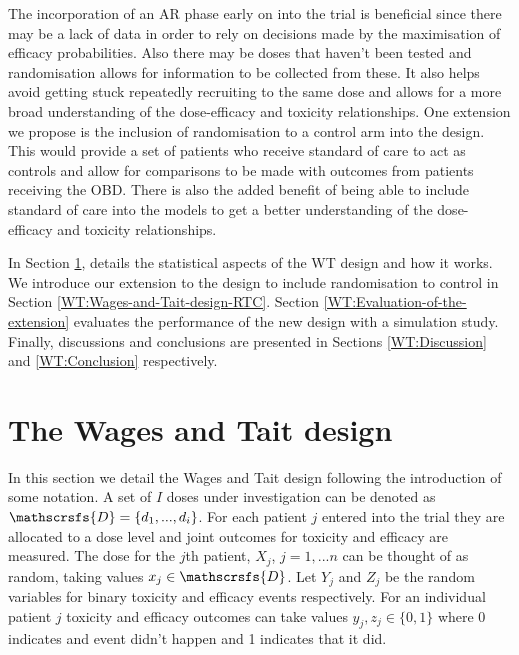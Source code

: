 The incorporation of an AR phase early on into the trial is beneficial since there may be a lack of data in order to rely on decisions made by the maximisation of efficacy probabilities. Also there may be doses that haven't been tested and randomisation allows for information to be collected from these. It also helps avoid getting stuck repeatedly recruiting to the same dose and allows for a more broad understanding of the dose-efficacy and toxicity relationships. One extension we propose is the inclusion of randomisation to a control arm into the design. This would provide a set of patients who receive standard of care to act as controls and allow for comparisons to be made with outcomes from patients receiving the OBD. There is also the added benefit of being able to include standard of care into the models to get a better understanding of the dose-efficacy and toxicity relationships.  

In Section \ref{WT:Wages-and-Tait-design}, details the statistical aspects of the WT design and how it works. We introduce our extension to the design to include randomisation to control in Section \ref{WT:Wages-and-Tait-design-RTC}. Section \ref{WT:Evaluation-of-the-extension} evaluates the performance of the new design with a simulation study. Finally, discussions and conclusions are presented in Sections \ref{WT:Discussion} and \ref{WT:Conclusion} respectively.  


\section{The Wages and Tait design}
\label{WT:Wages-and-Tait-design}

In this section we detail the Wages and Tait design following the introduction of some notation. A set of $I$ doses under investigation can be denoted as $\mathscrsfs{D} = \{d_1, ...,d_i\}$. For each patient $j$ entered into the trial they are allocated to a dose level and joint outcomes for toxicity and efficacy are measured. The dose for the $j$th patient, $X_j$, $j = 1,...n$ can be thought of as random, taking values $x_j \in  \mathscrsfs{D}$. Let $Y_j$ and $Z_j$ be the random variables for binary toxicity and efficacy events respectively. For an individual patient $j$ toxicity and efficacy outcomes can take values $y_j, z_j \in \{0,1\}$ where 0 indicates and event didn't happen and 1 indicates that it did. 

